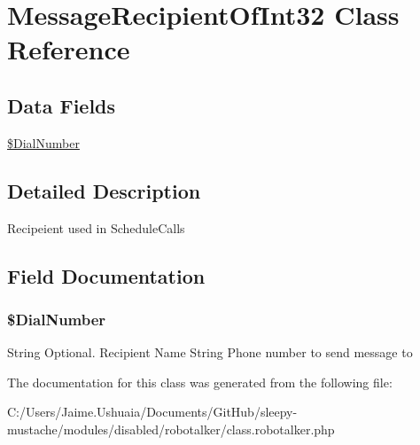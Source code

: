 \hypertarget{class_message_recipient_of_int32}{\section{Message\-Recipient\-Of\-Int32 Class Reference}
\label{class_message_recipient_of_int32}
}
\subsection*{Data Fields}
\begin{DoxyCompactItemize}
\item 
\hyperlink{class_message_recipient_of_int32_a80e5e7a3e0698eb7784c0251e40b8077}{\$\-Dial\-Number}
\end{DoxyCompactItemize}


\subsection{Detailed Description}
Recipeient used in Schedule\-Calls 

\subsection{Field Documentation}
\hypertarget{class_message_recipient_of_int32_a80e5e7a3e0698eb7784c0251e40b8077}{
\subsubsection[{\$\-Dial\-Number}]{\setlength{\rightskip}{0pt plus 5cm}\$Dial\-Number}}\label{class_message_recipient_of_int32_a80e5e7a3e0698eb7784c0251e40b8077}
String Optional. Recipient Name String Phone number to send message to 

The documentation for this class was generated from the following file\-:\begin{DoxyCompactItemize}
\item 
C\-:/\-Users/\-Jaime.\-Ushuaia/\-Documents/\-Git\-Hub/sleepy-\/mustache/modules/disabled/robotalker/class.\-robotalker.\-php\end{DoxyCompactItemize}
